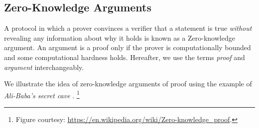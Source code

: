 \subsection{Zero-Knowledge Arguments}

A protocol in which a prover convinces a verifier that a statement
is true \textit{without} revealing any information about why it holds is known as a Zero-knowledge argument. An argument is a proof only if the prover is computationally bounded and some computational hardness holds. Hereafter, we use the terms \textit{proof} and \textit{argument} interchangeably. 

We illustrate the idea of zero-knowledge arguments of proof using the example of \textit{Ali-Baba's secret cave} \cite{jean89}. \footnote{Figure courtesy: \url{https://en.wikipedia.org/wiki/Zero-knowledge_proof}.}

